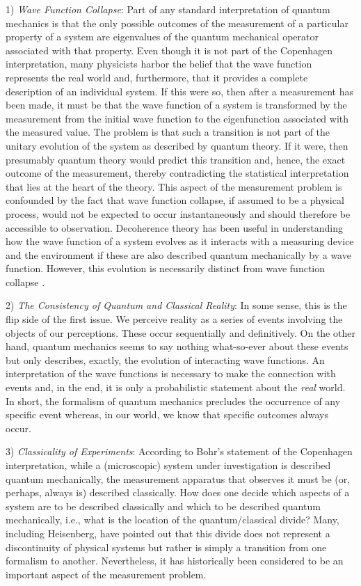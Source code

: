 \documentclass [12pt]{revtex4}
\begin{document}
1) \textit{Wave Function Collapse}: Part of any standard
interpretation of quantum mechanics is that the only possible
outcomes of the measurement of a particular property of a system are
eigenvalues of the quantum mechanical operator associated with that
property. Even though it is not part of the Copenhagen
interpretation, many physicists harbor the belief that the wave
function represents the real world and, furthermore, that it
provides a complete description of an individual system. If this
were so, then after a measurement has been made, it must be that the
wave function of a system is transformed by the measurement from the
initial wave function to the eigenfunction associated with the
measured value. The problem is that such a transition is not part of
the unitary evolution of the system as described by quantum theory.
If it were, then presumably quantum theory would predict this
transition and, hence, the exact outcome of the measurement, thereby
contradicting the statistical interpretation that lies at the heart
of the theory. This aspect of the measurement problem is confounded
by the fact that wave function collapse, if assumed to be a physical
process, would not be expected to occur instantaneously and should
therefore be accessible to observation. Decoherence theory has been
useful in understanding how the wave function of a system evolves as
it interacts with a measuring device and the environment if these are also
described quantum mechanically by a wave function.  However, this
evolution is necessarily distinct from wave function collapse \cite{S2004}.

2) \textit{The Consistency of Quantum and Classical Reality}: In
some sense, this is the flip side of the first issue.  We perceive
reality as a series of events involving the objects of our
perceptions.  These occur sequentially and definitively.  On the
other hand, quantum mechanics seems to say nothing what-so-ever
about these events but only describes, exactly, the evolution of
interacting wave functions.  An interpretation of the wave functions
is necessary to make the connection with events and, in the end, it
is only a probabilistic statement about the {\it real} world.  In
short, the formalism of quantum mechanics precludes the occurrence
of any specific event whereas, in our world, we know that specific
outcomes always occur.

3) \textit{Classicality of Experiments}: According to Bohr's
statement of the Copenhagen interpretation, while a (microscopic)
system under investigation is described quantum mechanically, the
measurement apparatus that observes it must be (or, perhaps, always
is) described classically. How does one decide which aspects of a
system are to be described classically and which to be described
quantum mechanically, i.e., what is the location of the
quantum/classical divide? Many, including Heisenberg, have
pointed out that this divide does not represent a discontinuity
of 	physical systems but rather is simply a transition from one
formalism to another.	Nevertheless, it has historically been
considered to be an important aspect of the measurement problem.
\end{document}
